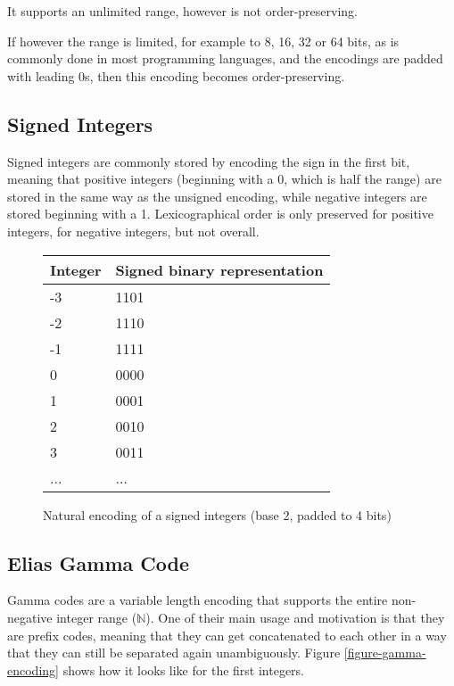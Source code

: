 \documentclass{acm_proc_article-sp}
\begin{document}
It supports an unlimited range, however is not order-preserving.

If however the range is limited, for example to 8, 16, 32 or 64 bits, as is commonly done in most programming languages, and the encodings are padded with leading 0s, then this encoding becomes order-preserving.

\subsection{Signed Integers}

Signed integers are commonly stored by encoding the sign in the first bit, meaning that positive integers (beginning with a 0, which is half the range) are stored in the same way as the unsigned encoding, while negative integers are stored beginning with a 1. Lexicographical order is only preserved for positive integers, for negative integers, but not overall.

\begin{figure}
\caption{Natural encoding of a signed integers (base 2, padded to 4 bits)}
\label{figure-natural-signed-encoding}
\center
\begin{tabular}{|l|l|}
\hline
Integer & Signed binary representation \\
\hline
-3 & 1101 \\
\hline
-2 & 1110 \\
\hline
-1 & 1111 \\
\hline
0 & 0000 \\
\hline
1 & 0001 \\
\hline
2 & 0010 \\
\hline
3 & 0011 \\
\hline
... & ... \\
\hline
\end{tabular}
\end{figure}

\subsection{Elias Gamma Code}
\label{section-gamma-code}

Gamma codes are a variable length encoding that supports the entire non-negative integer range ($\mathbb{N}$). One of their main usage and motivation is that they are prefix codes, meaning that they can get concatenated to each other in a way that they can still be separated again unambiguously. Figure \ref{figure-gamma-encoding} shows how it looks like for the first integers.
\end{document}
